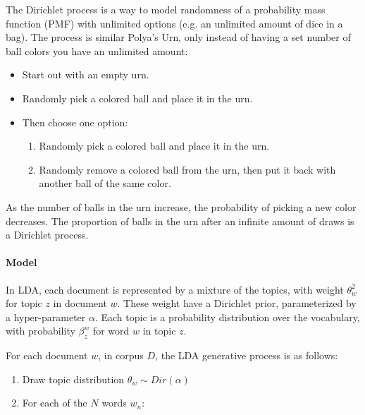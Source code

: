 \documentclass[12pt]{report}
\begin{document}
The Dirichlet process is a way to model randomness of a probability mass function 
(PMF) with unlimited options (e.g. an unlimited amount of dice in a bag). 
The process is similar Polya’s Urn, only instead of having a set number of ball 
colors you have an unlimited amount:

\begin{itemize}
\item Start out with an empty urn.
\item Randomly pick a colored ball and place it in the urn.
\item Then choose one option:
\begin{enumerate}
\item Randomly pick a colored ball and place it in the urn.
\item Randomly remove a colored ball from the urn, then put it back with another 
ball of the same color.
\end{enumerate}
\end{itemize}
 
As the number of balls in the urn increase, the probability of picking a new color 
decreases. The proportion of balls in the urn after an infinite amount of draws is 
a Dirichlet process.


\paragraph{Model}


In LDA, each document is represented by a mixture of the topics, with weight 
$\theta_w^2$ for topic $z$ in document $w$. These weight have a Dirichlet prior, 
parameterized by a hyper-parameter $\alpha$. Each topic is a probability 
distribution over the vocabulary, with probability $\beta^w_z$ for word $w$ in 
topic $z$.
 
For each document $w$, in corpus $D$, the LDA generative process is as follows:

\begin{enumerate}
	\item Draw topic distribution  $\theta_w \sim Dir(\alpha)$
	\item For each of the $N$ words $w_n$:
\end{enumerate}
\end{document}
